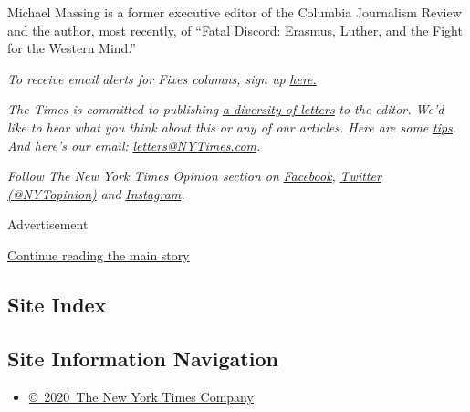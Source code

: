 Michael Massing is a former executive editor of the Columbia Journalism
Review and the author, most recently, of ``Fatal Discord: Erasmus,
Luther, and the Fight for the Western Mind.''

\emph{To receive email alerts for Fixes columns, sign up}
\href{http://eepurl.com/ABIxL}{\emph{here.}}

\emph{The Times is committed to publishing}
\href{https://www.nytimes3xbfgragh.onion/2019/01/31/opinion/letters/letters-to-editor-new-york-times-women.html}{\emph{a
diversity of letters}} \emph{to the editor. We'd like to hear what you
think about this or any of our articles. Here are some}
\href{https://help.nytimes3xbfgragh.onion/hc/en-us/articles/115014925288-How-to-submit-a-letter-to-the-editor}{\emph{tips}}\emph{.
And here's our email:}
\href{mailto:letters@NYTimes.com}{\emph{letters@NYTimes.com}}\emph{.}

\emph{Follow The New York Times Opinion section on}
\href{https://www.facebookcorewwwi.onion/nytopinion}{\emph{Facebook}}\emph{,}
\href{http://twitter.com/NYTOpinion}{\emph{Twitter (@NYTopinion)}}
\emph{and}
\href{https://www.instagram.com/nytopinion/}{\emph{Instagram}}\emph{.}

Advertisement

\protect\hyperlink{after-bottom}{Continue reading the main story}

\hypertarget{site-index}{%
\subsection{Site Index}\label{site-index}}

\hypertarget{site-information-navigation}{%
\subsection{Site Information
Navigation}\label{site-information-navigation}}

\begin{itemize}
\tightlist
\item
  \href{https://help.nytimes3xbfgragh.onion/hc/en-us/articles/115014792127-Copyright-notice}{©~2020~The
  New York Times Company}
\end{itemize}

